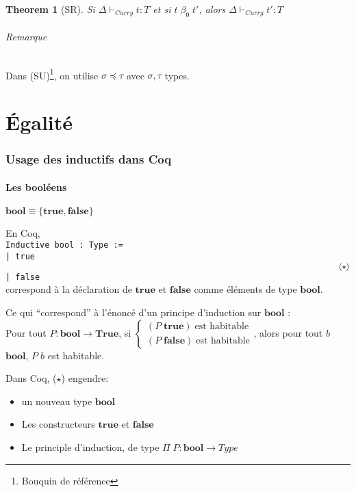 \documentclass{article}
\newtheorem{thm}{Theorem}
\begin{document}
\begin{thm}[SR]
Si $\Delta\vdash_{Curry} t:T$ et si $t\; \beta_0 \; t'$, alors $\Delta \vdash_{Curry} t': T$
\end{thm}

\paragraph{Remarque} Dans (SU)\footnote{Bouquin de référence}, on utilise $\sigma \preceq \tau$ avec $\sigma,\tau$ types.

\part{Égalité}
\setcounter{section}{-1}
\section{Usage des inductifs dans Coq}
\subsection{Les booléens}
$\mathbf{bool}\equiv \{\mathbf{true}, \mathbf{false}\}$

En Coq, \\
\texttt{Inductive bool : Type :=\\
| true $\hspace{410px} (\star)$\\
| false}\\
correspond à la déclaration de $\mathbf{true}$ et $\mathbf{false}$ comme éléments de type $\mathbf{bool}$.


Ce qui ``correspond'' à l'énoncé d'un principe d'induction sur $\mathbf{bool}$ :\\
Pour tout $P : \mathbf{bool} \to \mathbf{True}$, si $\begin{cases}
(P\; \mathbf{true}) \;\text{est habitable}\\
(P\; \mathbf{false}) \;\text{est habitable}
\end{cases}$, alors pour tout $b$ $\mathbf{bool}$, $P\; b$ est habitable.
\bigskip

Dans Coq, ($\star$) engendre:
\begin{itemize}[noitemsep,label=-]
\item un nouveau type $\mathbf{bool}$
\item Les constructeurs $\mathbf{true}$ et $\mathbf{false}$
\item Le principle d'induction, de type $\Pi \; P : \mathbf{bool} \to Type$
\end{itemize}
\end{document}
